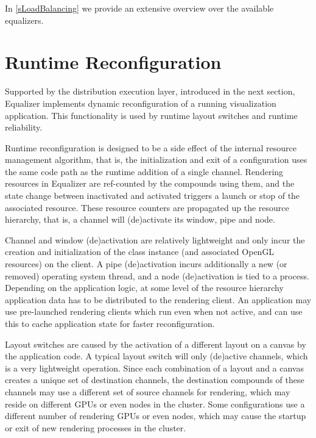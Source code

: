 In \cref{sLoadBalancing} we provide an extensive overview over the available
equalizers.

\section{Runtime Reconfiguration}

Supported by the distribution execution layer, introduced in the next section,
Equalizer implements dynamic reconfiguration of a running visualization
application. This functionality is used by runtime layout switches and runtime
reliability.

Runtime reconfiguration is designed to be a side effect of the internal resource
management algorithm, that is, the initialization and exit of a configuration
uses the same code path as the runtime addition of a single channel. Rendering
resources in Equalizer are ref-counted by the compounds using them, and the
state change between inactivated and activated triggers a launch or stop of the
associated resource. These resource counters are propagated up the resource
hierarchy, that is, a channel will (de)activate its window, pipe and node.

Channel and window (de)activation are relatively lightweight and only incur the
creation and initialization of the class instance (and associated OpenGL
resources) on the client. A pipe (de)activation incurs additionally a new (or
removed) operating system thread, and a node (de)activation is tied to a
process. Depending on the application logic, at some level of the resource
hierarchy application data has to be distributed to the rendering client. An
application may use pre-launched rendering clients which run even when not
active, and can use this to cache application state for faster reconfiguration.

Layout switches are caused by the activation of a different layout on a canvas
by the application code. A typical layout switch will only (de)active channels,
which is a very lightweight operation. Since each combination of a layout and a
canvas creates a unique set of destination channels, the destination compounds
of these channels may use a different set of source channels for rendering,
which may reside on different GPUs or even nodes in the cluster. Some
configurations use a different number of rendering GPUs or even nodes, which
may cause the startup or exit of new rendering processes in the cluster.

